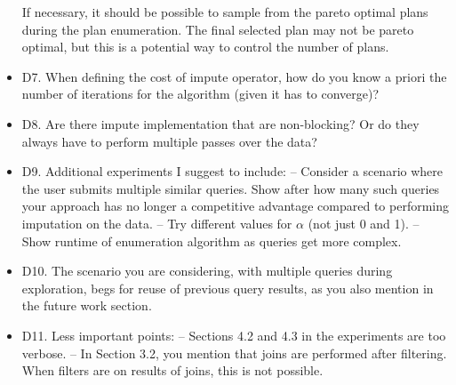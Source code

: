 \documentclass{vldb}
\newcommand{\resp}[1]{{\color{blue}{#1}}}
\begin{document}
\begin{itemize}
{    If necessary, it should be possible to sample from the pareto optimal plans during the plan enumeration. The final selected plan may not be pareto optimal, but this is a potential way to control the number of plans.}

\item D7. When defining the cost of impute operator, how do you know a priori the number of iterations for the algorithm (given it has to converge)?

\item D8. Are there impute implementation that are non-blocking? Or do they always have to perform multiple passes over the data?

\item D9. Additional experiments I suggest to include:
-- Consider a scenario where the user submits multiple similar queries. Show after how many such queries your approach has no longer a competitive advantage compared to performing imputation on the data.
-- Try different values for $\alpha$ (not just 0 and 1).
-- Show runtime of enumeration algorithm as queries get more complex.

\resp{
The sensitivity of different values of $\alpha$ depends on the query itself. Performing a scan of values of $\alpha$ with small step sizes can return
a lot of the same plans for execution. In lieu of this, we extended the results section to include a subsection that presents the final frontiers for
two queries, one from each dataset used during evaluation. This frontier can be exposed to the user to help in their workflow.
\\
We explored the planning times for queries with increasing number of joins. The standard algorithm presented in the original version submitted handles
up to 5 joins, with columns requiring imputation in all tables, with planning time of approximately one second. We added a small optimization to help reduce
planning times for a larger number of joins. We maintain an approximation of the Pareto sets, rather than the exact set, by only adding non-dominated plans that
are sufficiently different. This helps reduce some of the increases in planning time for a larger number of joins.}


\item D10. The scenario you are considering, with multiple queries during exploration, begs for reuse of previous query results, as you also mention in the future work section.

\item D11. Less important points:
-- Sections 4.2 and 4.3 in the experiments are too verbose.
-- In Section 3.2, you mention that joins are performed after filtering. When filters are on results of joins, this is not possible.


\end{itemize}
\end{document}
